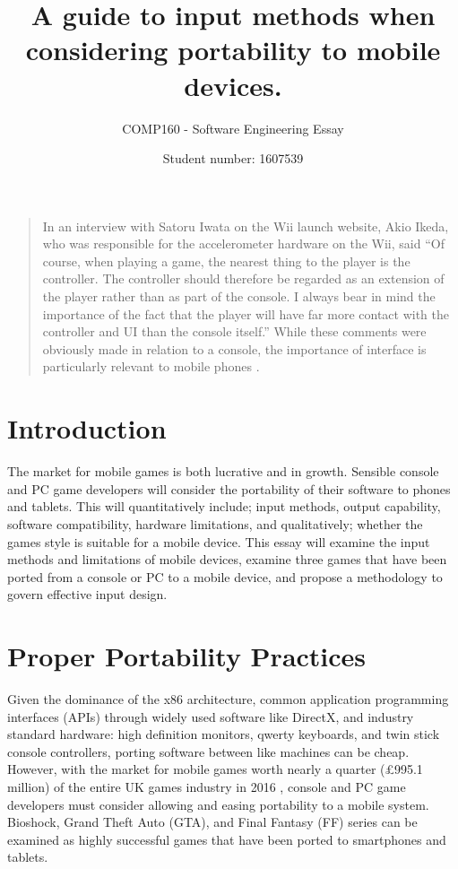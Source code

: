 \documentclass{scrartcl}
\title
{
A guide to input methods when considering portability to mobile devices.
}
\subtitle{COMP160 - Software Engineering Essay}
\author{Student number: 1607539}
\begin{document}
\maketitle

\blockquote{
In an interview with Satoru Iwata on the Wii launch website, Akio Ikeda, who was responsible for the accelerometer hardware on the Wii, said ``Of course, when playing a game, the nearest thing to the player is the controller. The controller should therefore be regarded as an extension of the player rather than as part of the console. I always bear in mind the importance of the fact that the player will have far more contact with the controller and UI than the console itself.'' While these comments were obviously made in relation to a console, the importance of interface is particularly relevant to mobile phones \cite {gilbertson2008using}.
}

\section*{Introduction}

The market for mobile games is both lucrative and in growth.  Sensible console and PC game developers will consider the portability of their software to phones and tablets. This will quantitatively include; input methods, output capability, software compatibility, hardware limitations, and qualitatively; whether the games style 
is suitable for a mobile device.  This essay will examine the input methods and limitations of mobile devices, examine three games that have been ported from a console or PC to a mobile device, and propose a methodology to govern effective input design.

\section*{Proper Portability Practices}

Given the dominance of the x86 architecture, common application programming interfaces (APIs) through widely used software like DirectX, and industry standard hardware: high definition monitors, qwerty keyboards, and twin stick console controllers, porting software between like machines can be cheap.  However, with the market for mobile games worth nearly a quarter (\pounds995.1 million) of the entire UK games industry in 2016 \cite {UKIE2017}, console and PC game developers must consider allowing and easing portability to a mobile system.  Bioshock, Grand Theft Auto (GTA), and Final Fantasy (FF) series can be examined as highly successful games that have been ported to smartphones and tablets.
\end{document}
